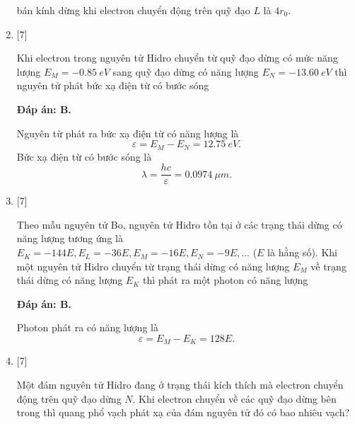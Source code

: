 \begin{enumerate}[label=\bfseries Câu \arabic*:]
{bán kính dừng khi electron chuyển động trên quỹ đạo $ L $ là $ 4 r_{0} $. 
		}	

		\item {} [7]
	
		\cauhoi
		{Khi electron trong nguyên tử Hidro chuyển từ quỹ đạo dừng có mức năng lượng $ E_{M} = \SI{-0,85}{eV} $ sang quỹ đạo dừng có năng lượng $ E_{N} = \SI{-13,60}{eV} $ thì nguyên tử phát bức xạ điện từ có bước sóng
		}
	
		\loigiai
		{		\textbf{Đáp án: B.}

Nguyên từ phát ra bức xạ điện từ có năng lượng là
$$
	\varepsilon = E_{M} - E_{N} = \SI{12,75}{eV}.
$$
Bức xạ điện từ có bước sóng là
$$
	\lambda = \dfrac{hc}{\varepsilon} = \SI{0,0974}{\mu m}.
$$
		}	
	
		\item {} [7]
	
		\cauhoi
		{Theo mẫu nguyên tử Bo, nguyên tử Hidro tồn tại ở các trạng thái dừng có năng lượng tương ứng là $ E_{K} = -144E, E_{L} = -36E, E_{M} = -16E, E_{N} = -9E,... $ ($ E $ là hằng số). Khi một nguyên tử Hidro chuyển từ trạng thái dừng có năng lượng $ E_{M} $ về trạng thái dừng có năng lượng $ E_{K} $ thì phát ra một photon có năng lượng
		}
	
		\loigiai
		{		\textbf{Đáp án: B.}

Photon phát ra có năng lượng là
$$
	\varepsilon = E_{M} - E_{K} = 128E.
$$
		}	
		
		\item {} [7]
	
		\cauhoi
		{ Một đám nguyên tử Hidro đang ở trạng thái kích thích mà electron chuyển động trên quỹ đạo dừng $ N $. Khi electron chuyển về các quỹ đạo dừng bên trong thì quang phổ vạch phát xạ của đám nguyên tử đó có bao nhiêu vạch?

}
\end{enumerate}
